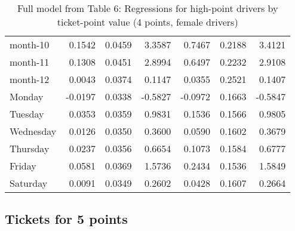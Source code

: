 \documentclass[10pt]{article}
\begin{document}
\begin{table}[ht]
\begin{tabular}{lrrrrrr}
  month-10 & 0.1542 & 0.0459 & 3.3587 & 0.7467 & 0.2188 & 3.4121 \\ 
  month-11 & 0.1308 & 0.0451 & 2.8994 & 0.6497 & 0.2232 & 2.9108 \\ 
  month-12 & 0.0043 & 0.0374 & 0.1147 & 0.0355 & 0.2521 & 0.1407 \\ 
  Monday & -0.0197 & 0.0338 & -0.5827 & -0.0972 & 0.1663 & -0.5847 \\ 
  Tuesday & 0.0353 & 0.0359 & 0.9831 & 0.1536 & 0.1566 & 0.9805 \\ 
  Wednesday & 0.0126 & 0.0350 & 0.3600 & 0.0590 & 0.1602 & 0.3679 \\ 
  Thursday & 0.0237 & 0.0356 & 0.6654 & 0.1073 & 0.1584 & 0.6777 \\ 
  Friday & 0.0581 & 0.0369 & 1.5736 & 0.2434 & 0.1536 & 1.5849 \\ 
  Saturday & 0.0091 & 0.0349 & 0.2602 & 0.0428 & 0.1607 & 0.2664 \\ 
   \hline
\end{tabular}
\caption{Full model from Table 6: Regressions for high-point drivers by ticket-point value (4 points, female drivers)} 
\label{tab_6_4_pts_no_age_F}
\end{table}


\clearpage
\pagebreak




\subsection{Tickets for 5 points}



\end{document}
